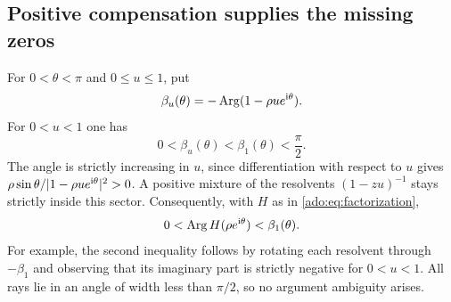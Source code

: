 \subsection{Positive compensation supplies the missing zeros}
For $0<\theta<\pi$ and $0\le u\le1$, put
\[
 \beta_u(\theta)=-\operatorname{Arg}(1-\rho u e^{\mathrm{i}\theta}).
\]
For $0<u<1$ one has
\begin{equation}\label{ado:eq:betasector}
 0<\beta_u(\theta)<\beta_1(\theta)<\frac\pi2.
\end{equation}
The angle is strictly increasing in $u$, since differentiation with
respect to $u$ gives $\rho\sin\theta/|1-\rho u e^{\mathrm{i}\theta}|^2>0$.
A positive mixture of the resolvents $(1-zu)^{-1}$ stays strictly inside
this sector. Consequently, with $H$ as in
\eqref{ado:eq:factorization},
\begin{equation}\label{ado:eq:Hsector}
 0<\operatorname{Arg} H(\rho e^{\mathrm{i}\theta})<\beta_1(\theta).
\end{equation}
For example, the second inequality follows by rotating each resolvent
through $-\beta_1$ and observing that its imaginary part is strictly
negative for $0<u<1$. All rays lie in an angle of width less than
$\pi/2$, so no argument ambiguity arises.

